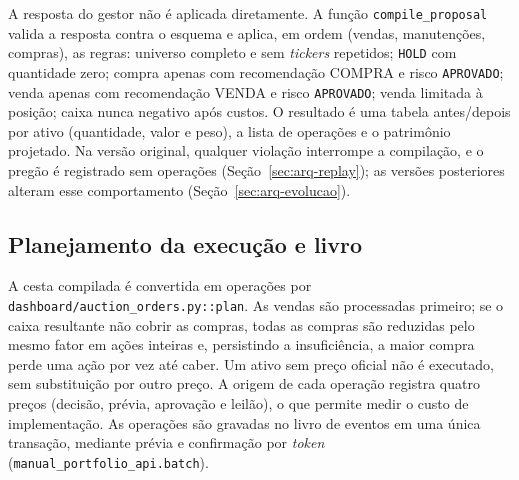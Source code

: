 \documentclass{eic-bcc-tcc}
\begin{document}
A resposta do gestor não é aplicada diretamente. A função \texttt{compile\_proposal} valida a resposta contra o esquema e aplica, em ordem (vendas, manutenções, compras), as regras: universo completo e sem \textit{tickers} repetidos; \texttt{HOLD} com quantidade zero; compra apenas com recomendação COMPRA e risco \texttt{APROVADO}; venda apenas com recomendação VENDA e risco \texttt{APROVADO}; venda limitada à posição; caixa nunca negativo após custos. O resultado é uma tabela antes/depois por ativo (quantidade, valor e peso), a lista de operações e o patrimônio projetado. Na versão original, qualquer violação interrompe a compilação, e o pregão é registrado sem operações (Seção~\ref{sec:arq-replay}); as versões posteriores alteram esse comportamento (Seção~\ref{sec:arq-evolucao}).

\subsection{Planejamento da execução e livro}

A cesta compilada é convertida em operações por \texttt{dashboard/auction\_orders.py::plan}. As vendas são processadas primeiro; se o caixa resultante não cobrir as compras, todas as compras são reduzidas pelo mesmo fator em ações inteiras e, persistindo a insuficiência, a maior compra perde uma ação por vez até caber. Um ativo sem preço oficial não é executado, sem substituição por outro preço. A origem de cada operação registra quatro preços (decisão, prévia, aprovação e leilão), o que permite medir o custo de implementação. As operações são gravadas no livro de eventos em uma única transação, mediante prévia e confirmação por \textit{token} (\texttt{manual\_portfolio\_api.batch}).
\end{document}

